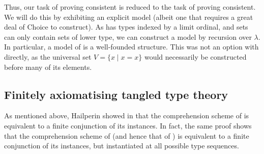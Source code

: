 Thus, our task of proving {\NF} consistent is reduced to the task of proving {\TTT} consistent.
We will do this by exhibiting an explicit model (albeit one that requires a great deal of Choice to construct).
As {\TTT} has types indexed by a limit ordinal, and sets can only contain sets of lower type, we can construct a model by recursion over \( \lambda \).
In particular, a model of {\TTT} is a well-founded structure.
This was not an option with {\NF} directly, as the universal set \( V = \{ x \mid x = x \} \) would necessarily be constructed before many of its elements.

\subsection{Finitely axiomatising tangled type theory}

As mentioned above, Hailperin showed in \cite{hailperin-finite-axiomatisation} that the comprehension scheme of {\NF} is equivalent to a finite conjunction of its instances.
In fact, the same proof shows that the comprehension scheme of {\TST} (and hence that of {\TTT}) is equivalent to a finite conjunction of its instances, but instantiated at all possible type sequences.

